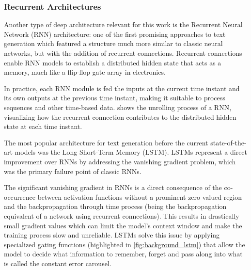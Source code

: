 \subsubsection*{Recurrent Architectures}

Another type of deep architecture relevant for this work is the Recurrent Neural Network (RNN) architecture: one of the first promising approaches to text generation which featured a structure much more similar to classic neural networks, but with the addition of recurrent connections.
Recurrent connections enable RNN models to establish a distributed hidden state that acts as a memory, much like a flip-flop gate array in electronics.

In practice, each RNN module is fed the inputs at the current time instant and its own outputs at the previous time instant, making it suitable to process sequences and other time-based data.
 shows the unrolling process of a RNN, visualizing how the recurrent connection contributes to the distributed hidden state at each time instant.

\begin{figure}[t!]
    \centering
    \quad
    \caption{}
    \label{fig:background_rnn_lstm}
\end{figure}

The most popular architecture for text generation before the current state-of-the-art models was the Long Short-Term Memory (LSTM).
LSTMs represent a direct improvement over RNNs by addressing the vanishing gradient problem, which was the primary failure point of classic RNNs.

The significant vanishing gradient in RNNs is a direct consequence of the co-occurrence between activation functions without a prominent zero-valued region and the backpropagation through time process (being the backpropagation equivalent of a network using recurrent connections).
This results in drastically small gradient values which can limit the model's context window and make the training process slow and unreliable.
LSTMs solve this issue by applying specialized gating functions (highlighted in \cref{fig:background_lstm}) that allow the model to decide what information to remember, forget and pass along into what is called the constant error carousel.

